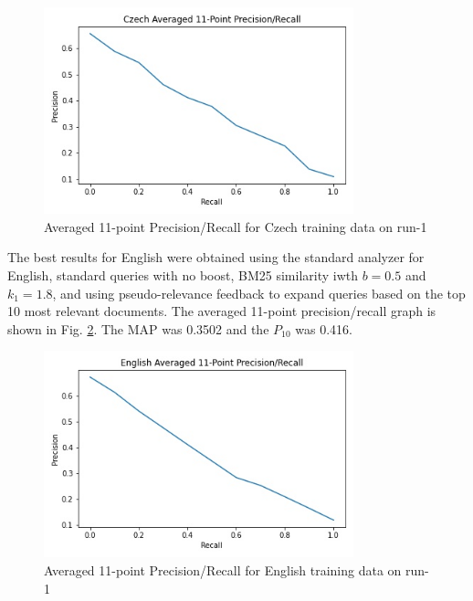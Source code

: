 \documentclass[a4paper]{article}
\begin{document}
\begin{figure}[htpb]
	\centering
	\includegraphics[width=0.8\textwidth]{plot_run-1_cs_precision_recall.jpg}
	\caption{Averaged 11-point Precision/Recall for Czech training data on run-1}
	\label{fig:cs_train_run_1}
\end{figure}

The best results for English were obtained using the standard analyzer for
English, standard queries with no boost, BM25 similarity iwth $b=0.5$ and
$k_1=1.8$, and using pseudo-relevance feedback to expand queries based on the
top 10 most relevant documents. The averaged 11-point precision/recall graph is
shown in Fig. \ref{fig:en_train_run_1}. The MAP was 0.3502 and the $P_{10}$ was
0.416.

\begin{figure}[htpb]
	\centering
	\includegraphics[width=0.8\textwidth]{plot_run-1_en_precision_recall.jpg}
	\caption{Averaged 11-point Precision/Recall for English training data on run-1}
	\label{fig:en_train_run_1}
\end{figure}
\end{document}
